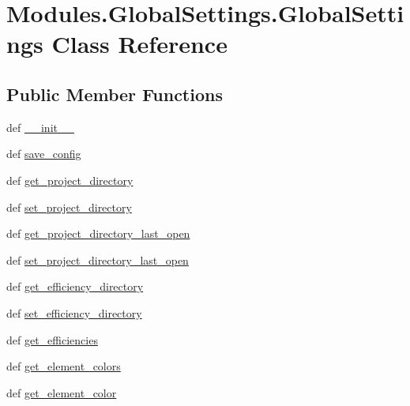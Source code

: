 \hypertarget{classModules_1_1GlobalSettings_1_1GlobalSettings}{\section{Modules.\-Global\-Settings.\-Global\-Settings Class Reference}
\label{classModules_1_1GlobalSettings_1_1GlobalSettings}
}
\subsection*{Public Member Functions}
\begin{DoxyCompactItemize}
\item 
def \hyperlink{classModules_1_1GlobalSettings_1_1GlobalSettings_a5374ba8c5adb5cf2626ccc1eed0e1ce7}{\-\_\-\-\_\-init\-\_\-\-\_\-}
\item 
def \hyperlink{classModules_1_1GlobalSettings_1_1GlobalSettings_a722d643c43a7cc6470d04b7fd706837a}{save\-\_\-config}
\item 
def \hyperlink{classModules_1_1GlobalSettings_1_1GlobalSettings_a098f4963e451da611a81247e3f25adf6}{get\-\_\-project\-\_\-directory}
\item 
def \hyperlink{classModules_1_1GlobalSettings_1_1GlobalSettings_ac32a5a4d505958a7159254818559896f}{set\-\_\-project\-\_\-directory}
\item 
def \hyperlink{classModules_1_1GlobalSettings_1_1GlobalSettings_ac55f2e77d5460b80c614cfacc47ca5a3}{get\-\_\-project\-\_\-directory\-\_\-last\-\_\-open}
\item 
def \hyperlink{classModules_1_1GlobalSettings_1_1GlobalSettings_acf0be005c88c958114aefaa627571048}{set\-\_\-project\-\_\-directory\-\_\-last\-\_\-open}
\item 
def \hyperlink{classModules_1_1GlobalSettings_1_1GlobalSettings_a54a0c17fb2b5eb31e2c0fda50662439c}{get\-\_\-efficiency\-\_\-directory}
\item 
def \hyperlink{classModules_1_1GlobalSettings_1_1GlobalSettings_a1a194eba526fbcedaefcef0a531ced1f}{set\-\_\-efficiency\-\_\-directory}
\item 
def \hyperlink{classModules_1_1GlobalSettings_1_1GlobalSettings_aee68a86ff11360bfc66ae6ceb32a8b47}{get\-\_\-efficiencies}
\item 
def \hyperlink{classModules_1_1GlobalSettings_1_1GlobalSettings_abcd6ddfa19369286022b9f6aa4b19c87}{get\-\_\-element\-\_\-colors}
\item 
def \hyperlink{classModules_1_1GlobalSettings_1_1GlobalSettings_aa902fb976071c2eeca3af6b450dee539}{get\-\_\-element\-\_\-color}

\end{DoxyCompactItemize}
